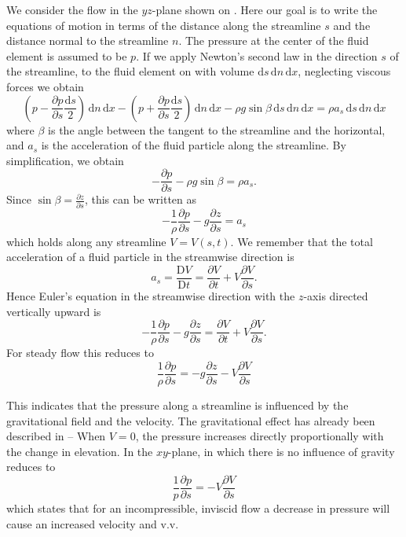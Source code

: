 We consider the flow in the $yz$-plane shown on . Here our goal is to write the equations of motion in terms of the distance along the streamline $s$ and the distance normal to the streamline $n$. The pressure at the center of the fluid element is assumed to be $p$. If we apply Newton's second law in the direction $s$ of the streamline, to the fluid element on  with volume $\mathrm{d}s \, \mathrm{d}n \, \mathrm{d}x$, neglecting viscous forces we obtain
\[ 
\left( p - \frac{\partial p}{\partial s} \frac{\mathrm{d}s}{2}  \right) \, \mathrm{d}n \, \mathrm{d}x - \left( p + \frac{\partial p}{\partial s} \frac{\mathrm{d}s}{2} \right) \, \mathrm{d}n \, \mathrm{d}x - \rho g \sin \beta \, \mathrm{d}s \, \mathrm{d}n \, \mathrm{d}x = \rho a_s \, \mathrm{d}s \, \mathrm{d}n \, \mathrm{d}x
\]
where $\beta$ is the angle between the tangent to the streamline and the horizontal, and $a_s$ is the acceleration of the fluid particle along the streamline. By simplification, we obtain
\[ 
- \frac{\partial p}{\partial s} - \rho g \sin \beta = \rho a_s
.\]
Since $\sin \beta = \frac{\partial z}{\partial s} $, this can be written as
\[ 
- \frac{1}{\rho} \frac{\partial p}{\partial s} - g \frac{\partial z}{\partial s}  = a_s
\]
which holds along any streamline $V = V(s,t)$. We remember that the total acceleration of a fluid particle in the streamwise direction is
\[ 
a_s = \frac{\mathrm{D}V}{\mathrm{D}t} = \frac{\partial V}{\partial t} + V \frac{\partial V}{\partial s}
.\]
Hence Euler's equation in the streamwise direction with the $z$-axis directed vertically upward is
\[ 
- \frac{1}{\rho} \frac{\partial p}{\partial s} - g \frac{\partial z}{\partial s} = \frac{\partial V}{\partial t} + V \frac{\partial V}{\partial s} 
.\]
For steady flow this reduces to
\begin{equation} \label{eq:euleqstrste}
\frac{1}{\rho} \frac{\partial p}{\partial s} = - g \frac{\partial z}{\partial s} - V \frac{\partial V}{\partial s}   
\end{equation}

This indicates that the pressure along a streamline is influenced by the gravitational field and the velocity. The gravitational effect has already been described in  -- When $V = 0$, the pressure increases directly proportionally with the change in elevation. In the $xy$-plane, in which there is no influence of gravity  reduces to
\[ 
\frac{1}{p} \frac{\partial p}{\partial s}  = - V \frac{\partial V}{\partial s} 
\]
which states that for an incompressible, inviscid flow a decrease in pressure will cause an increased velocity and v.v. 

